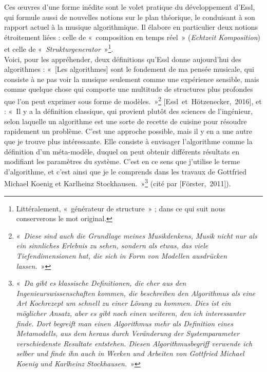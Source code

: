 \documentclass[a4paper,12pt]{article}
\newcommand{\guill}[1]{«~#1~»}
\newcommand{\cicite}[1]{{\footnotesize[#1]}}
\begin{document}
Ces œuvres d'une forme inédite sont le volet pratique du développement d'Essl, qui formule aussi de nouvelles notions sur le plan théorique, le conduisant à son rapport actuel à la musique algorithmique. Il élabore en particulier deux notions étroitement liées : celle de \guill{composition en temps réel} (\emph{Echtzeit Komposition}) et celle de \guill{\emph{Strukturgenerator}}\footnote{Littéralement, \guill{générateur de structure} ; dans ce qui suit nous conserverons le mot original.}. \\
Voici, pour les appréhender, deux définitions qu'Essl donne aujourd'hui des algorithmes : \guill{[Les algorithmes] sont le fondement de ma pensée musicale, qui consiste à ne pas voir la musique seulement comme une expérience sensible, mais comme quelque chose qui comporte une multitude de structures plus profondes que l'on peut exprimer sous forme de modèles.}\footnote{\guill{\emph{Diese sind auch die Grundlage meines Musikdenkens, Musik nicht nur als ein sinnliches Erlebnis zu sehen, sondern als etwas, das viele Tiefendimensionen hat, die sich in Form von Modellen ausdrücken lassen.}}} \cicite{Essl~et~Hötzenecker,~2016}, et : \guill{Il y a la définition classique, qui provient plutôt des sciences de l'ingénieur, selon laquelle un algorithme est une sorte de recette de cuisine pour résoudre rapidement un problème. C'est une approche possible, mais il y en a une autre que je trouve plus intéressante. Elle consiste à envisager l'algorithme comme la définition d'un méta-modèle, duquel on peut obtenir différents résultats en modifiant les paramètres du système. C'est en ce sens que j'utilise le terme d'algorithme, et c'est ainsi que je le comprends dans les travaux de Gottfried Michael Koenig et Karlheinz Stockhausen.}\footnote{\guill{\emph{Da gibt es klassische Definitionen, die eher aus den Ingenieurswissenschaften kommen, die beschreiben den Algorithmus als eine Art Kochrezept um schnell zu einer Lösung zu kommen. Dies ist ein möglicher Ansatz, aber es gibt noch einen weiteren, den ich interessanter finde. Dort begreift man einen Algorithmus mehr als Definition eines Metamodells, aus dem heraus durch Veränderung der Systemparameter verschiedenste Resultate entstehen. Diesen Algorithmusbegriff verwende ich selber und finde ihn auch in Werken und Arbeiten von Gottfried Michael Koenig und Karlheinz Stockhausen.}}} (cité par \cicite{Förster,~2011}). \\
\end{document}
